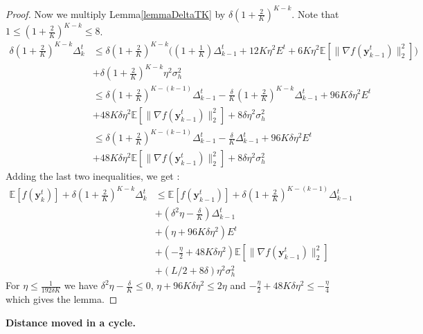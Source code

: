 \documentclass[10pt]{article} %
\theoremstyle{plain}
\theoremstyle{definition}
\theoremstyle{remark}
\newcommand{\norm}[1]{\|#1\|_2}
\def\vy{{\bm{y}}}
\newcommand{\E}{\mathbb{E}}
\begin{document}
\begin{proof}
Now we multiply Lemma\ref{lemmaDeltaTK} by $\delta (1 + \frac{2}{K})^{K-k}$. Note that $1 \leq (1 + \frac{2}{K})^{K-k}\leq 8$.
\begin{align*}
    \delta (1 + \frac{2}{K})^{K-k}\Delta^t_k &\leq \delta (1 + \frac{2}{K})^{K-k}\big((1+\frac{1}{K})\Delta^t_{k-1} + 12 K\eta^2 E^t + 6K\eta^2\E[\norm{\nabla f(\vy^t_{k-1})}^2]\big)\\&+ \delta (1 + \frac{2}{K})^{K-k}\eta^2\sigma_h^2\\
    &\leq \delta (1 + \frac{2}{K})^{K-(k-1)}\Delta^t_{k-1} - \frac{\delta}{K}(1 + \frac{2}{K})^{K-k}\Delta^t_{k-1} + 96 K\delta\eta^2E^t \\&+ 48 K\delta\eta^2\E[\norm{\nabla f(\vy^t_{k-1})}^2]+ 8\delta\eta^2\sigma_h^2\\
    &\leq \delta (1 + \frac{2}{K})^{K-(k-1)}\Delta^t_{k-1} - \frac{\delta}{K}\Delta^t_{k-1} + 96 K\delta\eta^2E^t\\& + 48 K\delta\eta^2\E[\norm{\nabla f(\vy^t_{k-1})}^2]+ 8\delta\eta^2\sigma_h^2
\end{align*}
Adding the last two inequalities, we get :
\begin{align*}
    \E[f(\vy^t_k)] + \delta (1 + \frac{2}{K})^{K-k}\Delta^t_k &\leq \E[f(\vy^t_{k-1})] + \delta (1 + \frac{2}{K})^{K-(k-1)}\Delta^t_{k-1} \\&+(\delta^2 \eta- \frac{\delta}{K})\Delta^t_{k-1} \\&+ (\eta+ 96 K\delta\eta^2)E^t \\&+ (- \frac{\eta}{2}+48 K\delta\eta^2)\E[\norm{\nabla f(\vy^t_{k-1})}^2]\\&+ (L/2 + 8\delta)\eta^2\sigma_h^2
\end{align*}
For $\eta\leq \frac{1}{192\delta K}$ we have $\delta^2 \eta- \frac{\delta}{K}\leq 0$, $\eta+ 96 K\delta\eta^2\leq 2\eta$ and $- \frac{\eta}{2}+48 K\delta\eta^2\leq - \frac{\eta}{4}$ which gives the lemma.
\end{proof}

\textbf{Distance moved in a cycle.}
\end{document}

